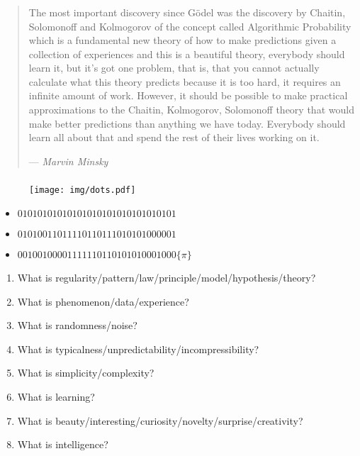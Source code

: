 \documentclass[UTF8,11pt,colorlinks,compress,openany]{beamer}%
\begin{document}
\begin{frame}\frametitle{}
\begin{quote}
The most important discovery since G\"odel was the discovery by Chaitin, Solomonoff and Kolmogorov of the concept called Algorithmic Probability which is a fundamental new theory of how to make predictions given a collection of experiences and this is a beautiful theory, everybody should learn it, but it's got one problem, that is, that you cannot actually calculate what this theory predicts because it is too hard, it requires an infinite amount of work. However, it should be possible to make practical approximations to the Chaitin, Kolmogorov, Solomonoff theory that would make better predictions than anything we have today. Everybody should learn all about that and spend the rest of their lives working on it.\par
\hfill --- \textsl{Marvin Minsky}
\end{quote}
\end{frame}

\begin{frame}\frametitle{}
			\begin{figure}
				\texttt{[image: img/dots.pdf]}
			\end{figure}
			\begin{itemize}
				\item $01010101010101010101010101010101$
				\item $01010011011110110111010101000001$
				\item $00100100001111110110101010001000$\hfill$\{\pi\}$
			\end{itemize}
	\begin{enumerate}
		\item What is regularity/pattern/law/principle/model/hypothesis/theory?
		\item What is phenomenon/data/experience?
		\item What is randomness/noise?
		\item What is typicalness/unpredictability/incompressibility?
		\item What is simplicity/complexity?
		\item What is learning?
		\item What is beauty/interesting/curiosity/novelty/surprise/creativity?
		\item What is intelligence?
	\end{enumerate}
\end{frame}
\end{document}
